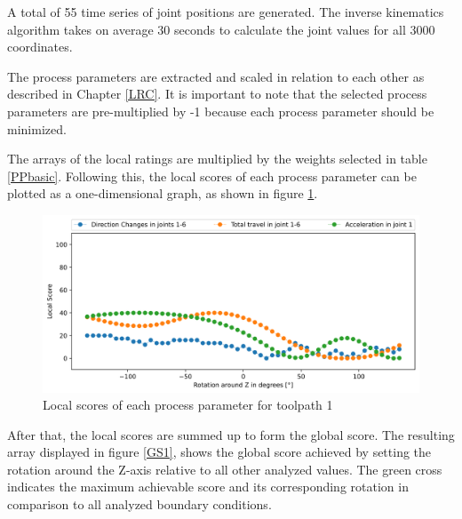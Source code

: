 A total of 55 time series of joint positions are generated. The inverse kinematics algorithm takes on average 30 seconds to calculate the joint values for all 3000 coordinates.

The process parameters are extracted and scaled in relation to each other as described in Chapter \ref{LRC}. It is important to note that the selected process parameters are pre-multiplied by -1 because each process parameter should be minimized.

The arrays of the local ratings are multiplied by the weights selected in table \ref{PPbasic}.
Following this, the local scores of each process parameter can be plotted as a one-dimensional graph, as shown in figure \ref{LS1}. %

\begin{figure}[H]
	\centerline{\includegraphics[width=1\textwidth]{figures/LocalScores_1.png}}
	\caption{Local scores of each process parameter for toolpath 1}
	\label{LS1}
\end{figure}

\newpage
After that, the local scores are summed up to form the global score. The resulting array displayed in figure \ref{GS1}, shows the global score achieved by setting the rotation around the Z-axis relative to all other analyzed values. The green cross indicates the maximum achievable score and its corresponding rotation in comparison to all analyzed boundary conditions.



